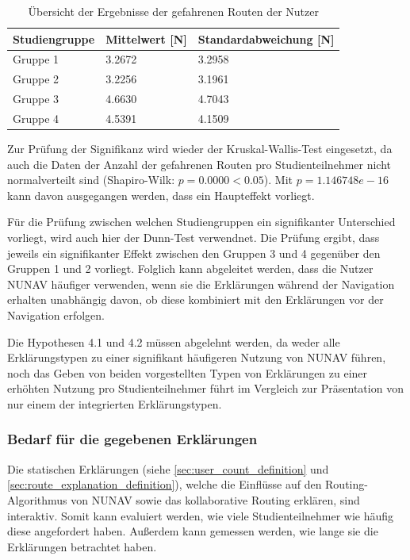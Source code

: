\begin{table}
    \centering
    \begin{tabular}{p{}p{}p{}}
        \hline
        Studiengruppe  & Mittelwert [N] & Standardabweichung [N] \\
        \toprule
        Gruppe 1                & 3.2672 & 3.2958 \\
        Gruppe 2                & 3.2256 & 3.1961 \\
        Gruppe 3                & 4.6630 & 4.7043 \\
        Gruppe 4                & 4.5391 & 4.1509 \\
        \bottomrule
    \end{tabular}
    \caption{Übersicht der Ergebnisse der gefahrenen Routen der Nutzer}
    \label{tab:study_offroute_results_2}
\end{table}

Zur Prüfung der Signifikanz wird wieder der Kruskal-Wallis-Test eingesetzt, da auch die Daten der Anzahl der gefahrenen Routen pro Studienteilnehmer nicht normalverteilt sind (Shapiro-Wilk: $ p = 0.0000 < 0.05 $). Mit $ p = 1.146748e-16 $ kann davon ausgegangen werden, dass ein Haupteffekt vorliegt.

Für die Prüfung zwischen welchen Studiengruppen ein signifikanter Unterschied vorliegt, wird auch hier der Dunn-Test verwendnet. Die Prüfung ergibt, dass jeweils ein signifikanter Effekt zwischen den Gruppen 3 und 4 gegenüber den Gruppen 1 und 2 vorliegt. Folglich kann abgeleitet werden, dass die Nutzer NUNAV häufiger verwenden, wenn sie die Erklärungen während der Navigation erhalten unabhängig davon, ob diese kombiniert mit den Erklärungen vor der Navigation erfolgen.

Die Hypothesen 4.1 und 4.2 müssen abgelehnt werden, da weder alle Erklärungstypen zu einer signifikant häufigeren Nutzung von NUNAV führen, noch das Geben von beiden vorgestellten Typen von Erklärungen zu einer erhöhten Nutzung pro Studienteilnehmer führt im Vergleich zur Präsentation von nur einem der integrierten Erklärungstypen.

\subsubsection{Bedarf für die gegebenen Erklärungen}

Die statischen Erklärungen (siehe \autoref{sec:user_count_definition} und \autoref{sec:route_explanation_definition}), welche die Einflüsse auf den Routing-Algorithmus von NUNAV sowie das kollaborative Routing erklären, sind interaktiv. Somit kann evaluiert werden, wie viele Studienteilnehmer wie häufig diese angefordert haben. Außerdem kann gemessen werden, wie lange sie die Erklärungen betrachtet haben.

